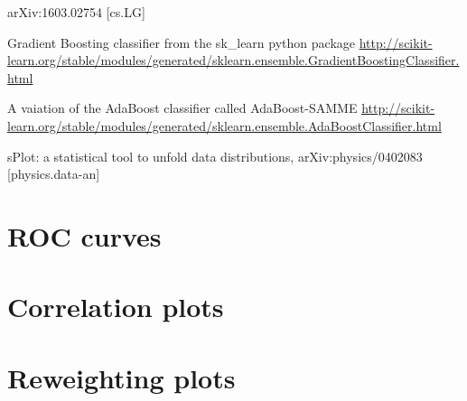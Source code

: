 \documentclass[english]{uzhpub}
\begin{document}
\begin{thebibliography}{100}
     arXiv:1603.02754 [cs.LG]

    Gradient Boosting classifier from the sk\_learn python package \url{http://scikit-learn.org/stable/modules/generated/sklearn.ensemble.GradientBoostingClassifier.html}

    A vaiation of the AdaBoost classifier called AdaBoost-SAMME \url{http://scikit-learn.org/stable/modules/generated/sklearn.ensemble.AdaBoostClassifier.html}


    sPlot: a statistical tool to unfold data distributions,
   	arXiv:physics/0402083 [physics.data-an]



 \end{thebibliography}

 \begin{appendix}
   \section{ROC curves}
   \label{app:roc}
   

   \section{Correlation plots}
   \label{app:corr}
   

   \section{Reweighting plots}
   \label{app:re}
   

 \end{appendix}

 
\end{document}
